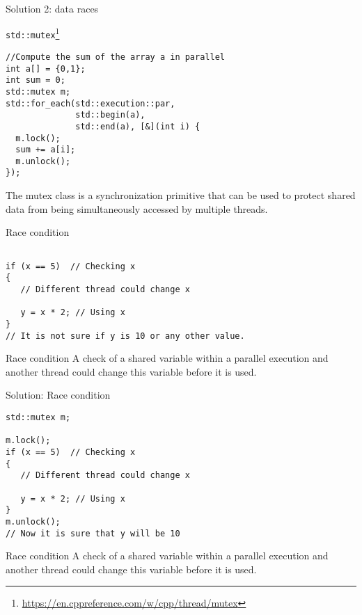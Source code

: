 \documentclass[12pt,t]{beamer}
\begin{document}
\begin{frame}[fragile]{Solution 2: data races}
\begin{block}{\lstinline|std::mutex|\footnote{\tiny\url{https://en.cppreference.com/w/cpp/thread/mutex}}}
\begin{lstlisting}
//Compute the sum of the array a in parallel
int a[] = {0,1};
int sum = 0;
std::mutex m;
std::for_each(std::execution::par, 
              std::begin(a), 
              std::end(a), [&](int i) {
  m.lock();
  sum += a[i];
  m.unlock(); 
});
\end{lstlisting}
\end{block}
The mutex class is a synchronization primitive that can be used to protect shared data from being simultaneously accessed by multiple threads. 
\end{frame}


\begin{frame}[fragile]{Race condition}

\begin{lstlisting}

if (x == 5)  // Checking x
{
   // Different thread could change x 
      
   y = x * 2; // Using x
}
// It is not sure if y is 10 or any other value.
\end{lstlisting}

\begin{block}{Race condition}
A check of a shared variable within a parallel execution and another thread could change this variable before it is used.
\end{block}

\end{frame}

\begin{frame}[fragile]{Solution: Race condition}


\begin{lstlisting}
std::mutex m;

m.lock();
if (x == 5)  // Checking x
{
   // Different thread could change x 
      
   y = x * 2; // Using x
}
m.unlock();
// Now it is sure that y will be 10
\end{lstlisting}

\begin{block}{Race condition}
A check of a shared variable within a parallel execution and another thread could change this variable before it is used.
\end{block}


\end{frame}
\end{document}
